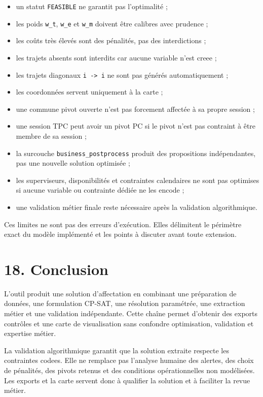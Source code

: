 \documentclass[11pt,a4paper]{article}
\begin{document}
\begin{itemize}
\item un statut \texttt{FEASIBLE} ne garantit pas l'optimalité ;
\item les poids \texttt{w\_t}, \texttt{w\_e} et \texttt{w\_m} doivent être calibres avec prudence ;
\item les coûts très élevés sont des pénalités, pas des interdictions ;
\item les trajets absents sont interdits car aucune variable n'est creee ;
\item les trajets diagonaux \texttt{i -> i} ne sont pas générés automatiquement ;
\item les coordonnées servent uniquement à la carte ;
\item une commune pivot ouverte n'est pas forcement affectée à sa propre session ;
\item une session TPC peut avoir un pivot PC si le pivot n'est pas contraint à être
membre de sa session ;

\item la surcouche \texttt{business\_postprocess} produit des propositions indépendantes,
pas une nouvelle solution optimisée ;

\item les superviseurs, disponibilités et contraintes calendaires ne sont pas
optimises si aucune variable ou contrainte dédiée ne les encode ;

\item une validation métier finale reste nécessaire après la validation
algorithmique.

\end{itemize}

Ces limites ne sont pas des erreurs d'exécution. Elles délimitent le périmètre exact du modèle implémenté et les points à discuter avant toute extension.

\section{18. Conclusion}

L'outil produit une solution d'affectation en combinant une préparation de données, une formulation CP-SAT, une résolution paramétrée, une extraction métier et une validation indépendante. Cette chaîne permet d'obtenir des exports contrôles et une carte de visualisation sans confondre optimisation, validation et expertise métier.

La validation algorithmique garantit que la solution extraite respecte les contraintes codees. Elle ne remplace pas l'analyse humaine des alertes, des choix de pénalités, des pivots retenus et des conditions opérationnelles non modélisées. Les exports et la carte servent donc à qualifier la solution et à faciliter la revue métier.
\end{document}
